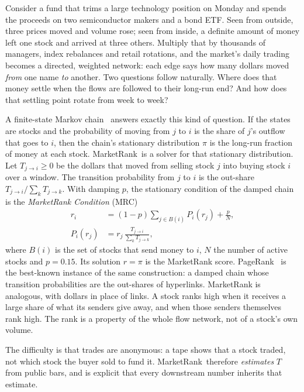 \documentclass[preprint,3p,twocolumn]{elsarticle}
\newcommand{\MR}{MarketRank}
\begin{document}
Consider a fund that trims a large technology position on Monday and spends the proceeds on two semiconductor makers and a bond ETF. Seen from outside, three prices moved and volume rose; seen from inside, a definite amount of money left one stock and arrived at three others. Multiply that by thousands of managers, index rebalances and retail rotations, and the market's daily trading becomes a directed, weighted network: each edge says how many dollars moved \emph{from} one name \emph{to} another. Two questions follow naturally. Where does that money settle when the flows are followed to their long-run end? And how does that settling point rotate from week to week?

A finite-state Markov chain~\cite{norris,kemenysnell} answers exactly this kind of question. If the states are stocks and the probability of moving from $j$ to $i$ is the share of $j$'s outflow that goes to $i$, then the chain's stationary distribution $\pi$ is the long-run fraction of money at each stock. \MR\ is a solver for that stationary distribution. Let $T_{j\to i}\ge 0$ be the dollars that moved from selling stock $j$ into buying stock $i$ over a window. The transition probability from $j$ to $i$ is the out-share $T_{j\to i}/\sum_k T_{j\to k}$. With damping $p$, the stationary condition of the damped chain is the \emph{MarketRank Condition} (MRC)
\begin{equation}
\begin{aligned}
r_i&=(1-p)\sum_{j\in B(i)}P_i(r_j)+\frac{p}{N},\\
P_i(r_j)&=r_j\,\frac{T_{j\to i}}{\sum_k T_{j\to k}},
\end{aligned}
\label{eqn:mrc}
\end{equation}
where $B(i)$ is the set of stocks that send money to $i$, $N$ the number of active stocks and $p=0.15$. Its solution $r=\pi$ is the MarketRank score. PageRank~\cite{brinpage,pagerank} is the best-known instance of the same construction: a damped chain whose transition probabilities are the out-shares of hyperlinks. MarketRank is analogous, with dollars in place of links. A stock ranks high when it receives a large share of what its senders give away, and when those senders themselves rank high. The rank is a property of the whole flow network, not of a stock's own volume.

The difficulty is that trades are anonymous: a tape shows that a stock traded, not which stock the buyer sold to fund it. \MR\ therefore \emph{estimates} $T$ from public bars, and is explicit that every downstream number inherits that estimate.
\end{document}
